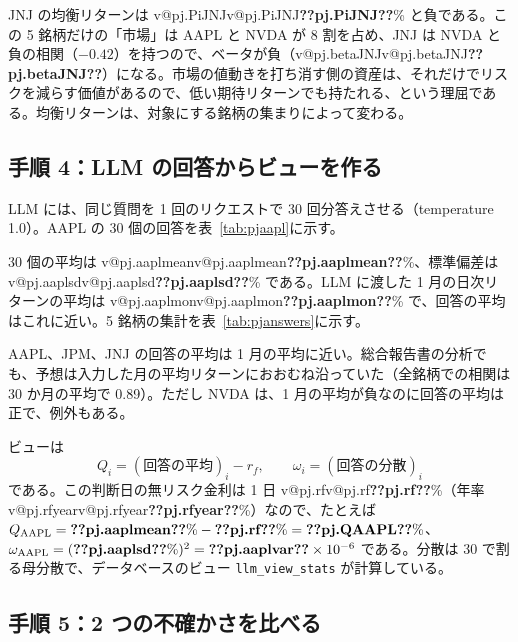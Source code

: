 \documentclass[xelatex,ja=standard,jafont=hiragino-pron,a4paper,11pt,openany]{bxjsreport}
\makeatletter
\newcommand{\V}[1]{\ifcsname v@#1\endcsname\csname v@#1\endcsname\else\textbf{??#1??}\fi}
\newcommand{\tabin}[1]{\adjustbox{max width=\linewidth}{}}
\newcommand{\code}[1]{\texttt{#1}}
\newcommand{\tabref}[1]{表~\ref{#1}}
\makeatother
\begin{document}
JNJ の均衡リターンは \V{pj.PiJNJ}\% と負である。この 5 銘柄だけの「市場」は AAPL と NVDA が 8 割を占め、JNJ は NVDA と負の相関（$-0.42$）を持つので、ベータが負（\V{pj.betaJNJ}）になる。市場の値動きを打ち消す側の資産は、それだけでリスクを減らす価値があるので、低い期待リターンでも持たれる、という理屈である。均衡リターンは、対象にする銘柄の集まりによって変わる。

\subsection{手順 4：LLM の回答からビューを作る}

LLM には、同じ質問を 1 回のリクエストで 30 回分答えさせる（temperature 1.0）。AAPL の 30 個の回答を\tabref{tab:pjaapl}に示す。

\begin{table}[htbp]
\centering
\caption{AAPL についての 30 個の回答（翌月の平均日次リターン、\%）。}
\label{tab:pjaapl}
\footnotesize\tabin{pj_aapl}
\end{table}

30 個の平均は \V{pj.aaplmean}\%、標準偏差は \V{pj.aaplsd}\% である。LLM に渡した 1 月の日次リターンの平均は \V{pj.aaplmon}\% で、回答の平均はこれに近い。5 銘柄の集計を\tabref{tab:pjanswers}に示す。

\begin{table}[htbp]
\centering
\caption{5 銘柄の回答の集計（1 日あたり）。「1 月の平均」は LLM に渡した日次リターンの平均。}
\label{tab:pjanswers}
\small\tabin{pj_answers}
\end{table}

AAPL、JPM、JNJ の回答の平均は 1 月の平均に近い。総合報告書の分析でも、予想は入力した月の平均リターンにおおむね沿っていた（全銘柄での相関は 30 か月の平均で 0.89）。ただし NVDA は、1 月の平均が負なのに回答の平均は正で、例外もある。

ビューは
\[
Q_i = (\text{回答の平均})_i - r_f,\qquad \omega_i = (\text{回答の分散})_i
\]
である。この判断日の無リスク金利は 1 日 \V{pj.rf}\%（年率 \V{pj.rfyear}\%）なので、たとえば $Q_{\mathrm{AAPL}} = \V{pj.aaplmean}\% - \V{pj.rf}\% = \V{pj.QAAPL}\%$、$\omega_{\mathrm{AAPL}} = (\V{pj.aaplsd}\%)^2 = \V{pj.aaplvar} \times 10^{-6}$ である。分散は 30 で割る母分散で、データベースのビュー \code{llm\_view\_stats} が計算している。

\subsection{手順 5：2 つの不確かさを比べる}
\end{document}
